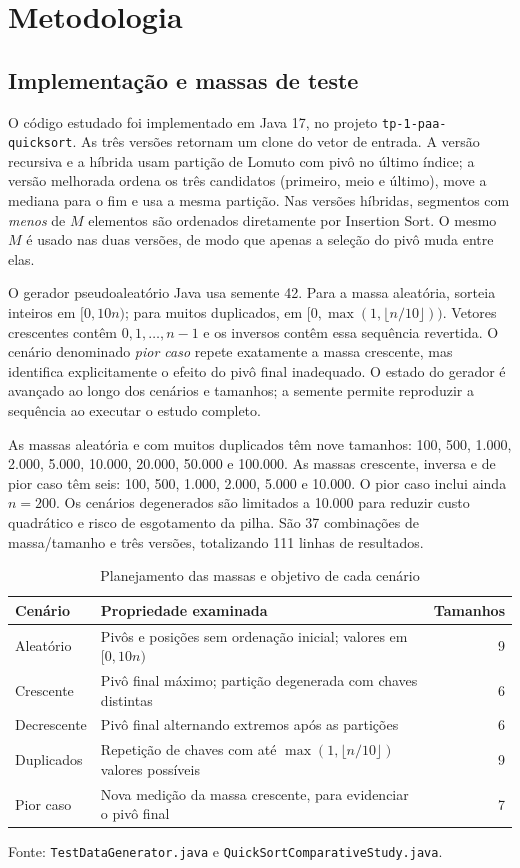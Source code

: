 \chapter{Metodologia}
\label{cap:metodologia}

\section{Implementação e massas de teste}

O código estudado foi implementado em Java 17, no projeto \texttt{tp-1-paa-quicksort}. As três versões retornam um clone do vetor de entrada. A versão recursiva e a híbrida usam partição de Lomuto com pivô no último índice; a versão melhorada ordena os três candidatos (primeiro, meio e último), move a mediana para o fim e usa a mesma partição. Nas versões híbridas, segmentos com \emph{menos} de $M$ elementos são ordenados diretamente por Insertion Sort. O mesmo $M$ é usado nas duas versões, de modo que apenas a seleção do pivô muda entre elas.

O gerador pseudoaleatório Java usa semente 42. Para a massa aleatória, sorteia inteiros em $[0,10n)$; para muitos duplicados, em $[0,\max(1,\lfloor n/10\rfloor))$. Vetores crescentes contêm $0,1,\ldots,n-1$ e os inversos contêm essa sequência revertida. O cenário denominado \emph{pior caso} repete exatamente a massa crescente, mas identifica explicitamente o efeito do pivô final inadequado. O estado do gerador é avançado ao longo dos cenários e tamanhos; a semente permite reproduzir a sequência ao executar o estudo completo.

As massas aleatória e com muitos duplicados têm nove tamanhos: 100, 500, 1.000, 2.000, 5.000, 10.000, 20.000, 50.000 e 100.000. As massas crescente, inversa e de pior caso têm seis: 100, 500, 1.000, 2.000, 5.000 e 10.000. O pior caso inclui ainda $n=200$. Os cenários degenerados são limitados a 10.000 para reduzir custo quadrático e risco de esgotamento da pilha. São 37 combinações de massa/tamanho e três versões, totalizando 111 linhas de resultados.

\begin{table}[htbp]
\centering
\caption{Planejamento das massas e objetivo de cada cenário}
\label{tab:massas}
\begin{tabular}{p{3cm} p{7cm} r}
\hline
Cenário & Propriedade examinada & Tamanhos \\
\hline
Aleatório & Pivôs e posições sem ordenação inicial; valores em $[0,10n)$ & 9 \\
Crescente & Pivô final máximo; partição degenerada com chaves distintas & 6 \\
Decrescente & Pivô final alternando extremos após as partições & 6 \\
Duplicados & Repetição de chaves com até $\max(1,\lfloor n/10\rfloor)$ valores possíveis & 9 \\
Pior caso & Nova medição da massa crescente, para evidenciar o pivô final & 7 \\
\hline
\end{tabular}
\par\smallskip\footnotesize Fonte: \texttt{TestDataGenerator.java} e \texttt{QuickSortComparativeStudy.java}.\normalsize
\end{table}

